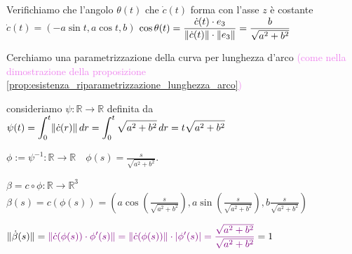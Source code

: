 \begin{esempio}
\begin{enumerate}
\begin{center}
            \end{center}
            Verifichiamo che l'angolo $\theta(t)$ che $\dot{c}(t)$ forma con l'asse $z$ è costante
            $\dot{c}(t) = (-a \sin t, a \cos t, b)$ $\displaystyle \cos \theta(t) = \frac{\dot{c}(t) \cdot e_3}{\lVert\dot{c}(t)\rVert \cdot \lVert e_3\rVert} = \frac{b}{\sqrt{a^2 + b^2}}$

            Cerchiamo una parametrizzazione della curva per lunghezza d'arco \textcolor{violet}{(come nella dimostrazione della proposizione \ref{prop:esistenza_riparametrizzazione_lunghezza_arco})} 
            
            consideriamo $\psi: \mathbb{R} \to \mathbb{R}$ definita da 
            $\displaystyle \psi(t) = \int_0^t \lVert\dot{c}(r)\rVert \, dr = \int_0^t \sqrt{a^2 + b^2} \, dr = t \sqrt{a^2 + b^2}$

            $\displaystyle \phi := \psi^{-1} : \mathbb{R} \to \mathbb{R} \quad \phi(s) = \frac{s}{\sqrt{a^2 + b^2}}$.

            $\beta = c \circ \phi : \mathbb{R} \to \mathbb{R}^3$
            $\displaystyle \beta(s) = c(\phi(s)) = \left( a \cos\left(\frac{s}{\sqrt{a^2 + b^2}}\right), a\sin\left(\frac{s}{\sqrt{a^2 + b^2}}\right), b \frac{s}{\sqrt{a^2 + b^2}} \right)$

            $\displaystyle \lVert\dot{\beta}(s)\rVert = \textcolor{violet}{ \lVert\dot{c}(\phi(s)) \cdot \phi'(s)\rVert = \lVert\dot{c}(\phi(s))\rVert \cdot \lvert\phi'(s)\rvert = \frac{\sqrt{a^2 + b^2}}{\sqrt{a^2 + b^2}}} = 1$
        \end{enumerate}
        \end{esempio}
